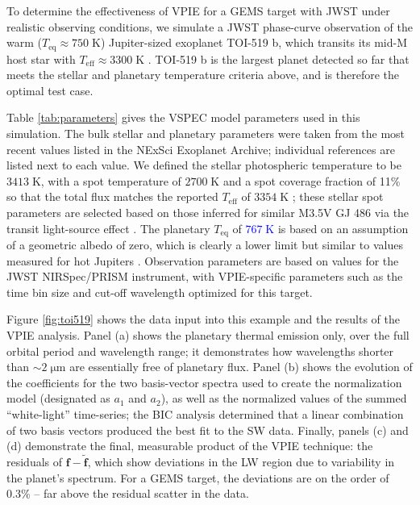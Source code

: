 \documentclass[twocolumn,linenumbers]{aastex7}
\newcommand{\update}[1]{\textcolor{blue}{\bf #1}}
\begin{document}
To determine the effectiveness of VPIE for a GEMS target with JWST under realistic observing conditions, we simulate a JWST phase-curve observation of the warm ($T_\mathrm{eq}\approx 750\; \mathrm{K}$) Jupiter-sized exoplanet TOI-519 b, which transits its mid-M host star with $T_\mathrm{eff}\approx 3300\; \mathrm{K}$ \citep{parviainen2021,hartman2023,kagetani2023}. TOI-519 b is the largest planet detected so far that meets the stellar and planetary temperature criteria above, and is therefore the optimal test case.

Table \ref{tab:parameters} gives the VSPEC model parameters used in this simulation.  The bulk stellar and planetary parameters were taken from the most recent values listed in the NExSci Exoplanet Archive; individual references are listed next to each value. We defined the stellar photospheric temperature to be $3413\;\mathrm{K}$, with a spot temperature of $2700\;\mathrm{K}$ and a spot coverage fraction of 11\% so that the total flux matches the reported $T_\mathrm{eff}$ of $3354\;\mathrm{K}$ \citep{kagetani2023}; these stellar spot parameters are selected based on those inferred for similar M3.5V GJ 486 via the transit light-source effect \citep{moran2023}. The planetary $T_\mathrm{eq}$ of \update{$767\;\mathrm{K}$} is based on an assumption of a geometric albedo of zero, which is clearly a lower limit but similar to values measured for hot Jupiters \citep{krenn2023}.  Observation parameters are based on values for the JWST NIRSpec/PRISM instrument, with VPIE-specific parameters such as the time bin size and cut-off wavelength optimized for this target.


Figure \ref{fig:toi519} shows the data input into this example and the results of the VPIE analysis. Panel (a) shows the planetary thermal emission only, over the full orbital period and wavelength range; it demonstrates how wavelengths shorter than $\sim2\;\mathrm{\mu m}$ are essentially free of planetary flux. Panel (b) shows the evolution of the coefficients for the two basis-vector spectra used to create the normalization model (designated as $a_1$ and $a_2$), as well as the normalized values of the summed ``white-light'' time-series; the BIC analysis determined that a linear combination of two basis vectors produced the best fit to the SW data. Finally, panels (c) and (d) demonstrate the final, measurable product of the VPIE technique: the residuals of $\bm{f}-\tilde{\bm{f}}$, which show  deviations in the LW region due to variability in the planet's spectrum. For a GEMS target, the deviations are on the order of 0.3\% -- far above the residual scatter in the data.
\end{document}
